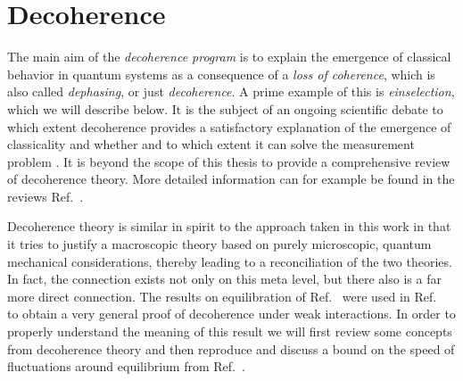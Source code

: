 \documentclass[a4paper,12pt,listof=totoc,index=totoc,bibliography=totoc,headsepline=false,headings=normal,BCOR16.153846mm,DIV12,headinclude,twoside,cleardoublepage=empty,numbers=noenddot,final]{scrreprt}
\theoremstyle{mystyle}
\numberwithin{equation}{section}
\numberwithin{figure}{section}
\numberwithin{lemma}{section}
\numberwithin{theorem}{section}
\numberwithin{corollary}{section}
\numberwithin{definition}{section}
\numberwithin{conjecture}{section}
\numberwithin{observation}{section}
\newcommand{\+}{\mkern2mu}
\DeclareMathOperator{\1}{\mathds{1}}
\begin{document}
\section{Decoherence}
\label{sec:decoherence}
%
The main aim of the \emph{decoherence program} is to explain the emergence of classical behavior in quantum systems as a consequence of a \emph{loss of coherence}, which is also called \emph{dephasing}, or just \emph{decoherence}.
A prime example of this is \emph{einselection}, which we will describe below.
It is the subject of an ongoing scientific debate to which extent decoherence provides a satisfactory explanation of the emergence of classicality and whether and to which extent it can solve the measurement problem \cite{Schlosshauer2005,0112095v3,0908.4069v1}.
It is beyond the scope of this thesis to provide a comprehensive review of decoherence theory.
More detailed information can for example be found in the reviews Ref.~\cite{RevModPhys.75.715,Schlosshauer2005}.

Decoherence theory is similar in spirit to the approach taken in this work in that it tries to justify a macroscopic theory based on purely microscopic, quantum mechanical considerations, thereby leading to a reconciliation of the two theories.
In fact, the connection exists not only on this meta level, but there also is a far more direct connection.
The results on equilibration of Ref.~\cite{Linden10} were used in Ref.~\cite{PhysRevE.81.05-1} to obtain a very general proof of decoherence under weak interactions.
In order to properly understand the meaning of this result we will first review some concepts from decoherence theory and then reproduce and discuss a bound on the speed of fluctuations around equilibrium from Ref.~\cite{Linden10}.
\end{document}

